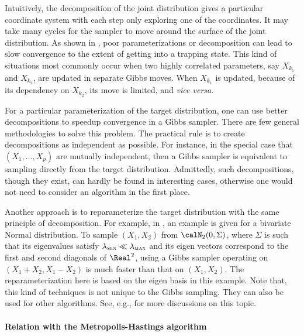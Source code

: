 Intuitively, the decomposition of the joint distribution gives a particular coordinate system with each step only exploring one of the coordinates. It may take many cycles for the sampler to move around the surface of the joint distribution. As shown in \cite[][note~9.7.1]{Robert:2004tn}, poor parameterizations or decomposition can lead to slow convergence to the extent of getting into a trapping state. This kind of situations most commonly occur when two highly correlated parameters, say $X_{k_1}$ and $X_{k_2}$, are updated in separate Gibbs moves. When $X_{k_1}$ is updated, because of its dependency on $X_{k_2}$, its move is limited, and \emph{vice versa}.

For a particular parameterization of the target distribution, one can use better decompositions to speedup convergence in a Gibbs sampler. There are few general methodologies to solve this problem. The practical rule is to create decompositions as independent as possible. For instance, in the special case that $(X_1,\dots,X_p)$ are mutually independent, then a Gibbs sampler is equivalent to sampling directly from the target distribution. Admittedly, such decompositions, though they exist, can hardly be found in interesting cases, otherwise one would not need to consider an \mcmc algorithm in the first place.

Another approach is to reparameterize the target distribution with the same principle of decomposition. For example, in \cite[][sec.~10.4.1]{Robert:2004tn}, an example is given for a bivariate Normal distribution. To sample $(X_1,X_2)$ from $\calN_2(0, \Sigma)$, where $\Sigma$ is such that its eigenvalues satisfy $\lambda_{\text{\textsc{min}}} \ll \lambda_{\text{\textsc{max}}}$ and its eigen vectors correspond to the first and second diagonals of $\Real^2$, using a Gibbs sampler operating on $(X_1 + X_2, X_1 - X_2)$ is much faster than that on $(X_1,X_2)$. The reparameterization here is based on the eigen basis in this example. Note that, this kind of techniques is not unique to the Gibbs sampling. They can also be used for other \mcmc algorithms. See, e.g., \cite{Hills:1993vb,Gilks:1996vx} for more discussions on this topic.

\paragraph{Relation with the Metropolis-Hastings algorithm}


